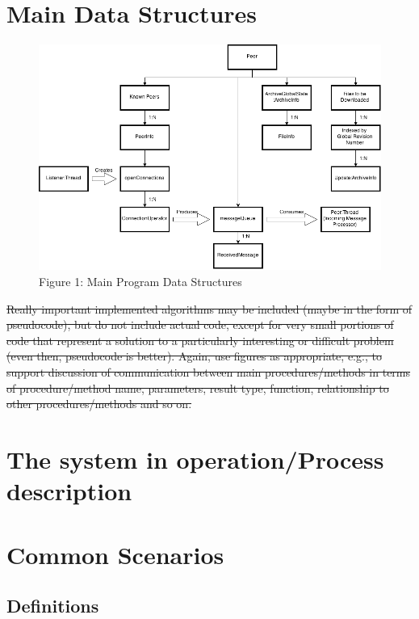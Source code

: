 \documentclass[12pt,a4paper,]{adreport}
\begin{document}
\section{Main Data Structures}\label{main-data-structures}

\begin{figure}[htbp]
\centering
\includegraphics{strucs.png}
\caption{Figure 1: Main Program Data Structures}
\end{figure}

\sout{Really important implemented algorithms may be included (maybe in
the form of pseudocode), but do not include actual code, except for very
small portions of code that represent a solution to a particularly
interesting or difficult problem (even then, pseudocode is better).
Again, use figures as appropriate, e.g., to support discussion of
communication between main procedures/methods in terms of
procedure/method name, parameters, result type, function, relationship
to other procedures/methods and so on.}

\section{The system in operation/Process
description}\label{the-system-in-operationprocess-description}

\section{Common Scenarios}\label{common-scenarios}

\subsection{Definitions}\label{definitions}
\end{document}
